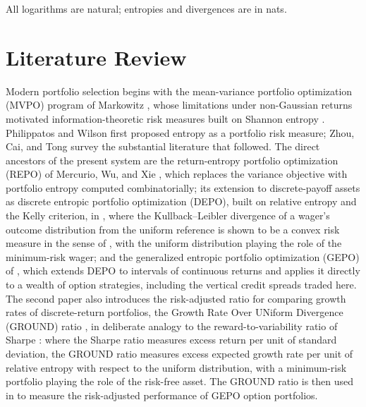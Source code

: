 \documentclass[11pt]{article}
\begin{document}
All logarithms are natural; entropies and divergences are in nats.

\section{Literature Review}
\label{sec:lit}

Modern portfolio selection begins with the mean-variance portfolio
optimization (MVPO) program of Markowitz \cite{markowitz1952}, whose limitations under non-Gaussian returns motivated
information-theoretic risk measures built on Shannon entropy \cite{shannon1948}.
Philippatos and Wilson \cite{philippatos1972} first proposed entropy as a
portfolio risk measure; Zhou, Cai, and Tong \cite{zhou2013} survey the
substantial literature that followed. The direct ancestors of the present
system are the return-entropy portfolio optimization (REPO) of Mercurio, Wu,
and Xie \cite{mercurio2020repo}, which replaces the variance objective with
portfolio entropy computed combinatorially; its extension to discrete-payoff
assets as discrete entropic portfolio optimization (DEPO), built on relative
entropy and the Kelly criterion, in
\cite{mercurio2020binary}, where the Kullback--Leibler divergence of a wager's
outcome distribution from the uniform reference is shown to be a convex risk
measure in the sense of \cite{follmer2002}, with the uniform distribution
playing the role of the minimum-risk wager; and the generalized entropic
portfolio optimization (GEPO) of \cite{mercurio2020gepo}, which extends DEPO to
intervals of continuous returns and applies it directly
to a wealth of option strategies, including the vertical credit spreads traded
here. The second paper also introduces the risk-adjusted ratio for comparing
growth rates of discrete-return portfolios, the Growth Rate Over UNiform
Divergence (GROUND) ratio \cite{mercurio2020binary}, in deliberate analogy to
the reward-to-variability ratio of Sharpe \cite{sharpe1966}: where the Sharpe
ratio measures excess return per unit of standard deviation, the GROUND ratio
measures excess expected growth rate per unit of relative entropy with respect
to the uniform distribution, with a minimum-risk portfolio playing the role of
the risk-free asset. The GROUND ratio is then used in \cite{mercurio2020gepo}
to measure the risk-adjusted performance of GEPO option portfolios.
\end{document}
